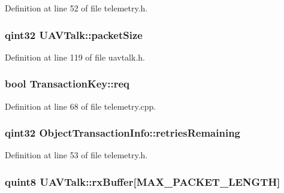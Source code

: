 Definition at line 52 of file telemetry.\-h.

\hypertarget{group___u_a_v_talk_plugin_gaa014be97504e5d24ac39f2808976685e}{
\subsubsection[{packet\-Size}]{\setlength{\rightskip}{0pt plus 5cm}qint32 U\-A\-V\-Talk\-::packet\-Size\hspace{0.3cm}{\ttfamily [protected]}}}\label{group___u_a_v_talk_plugin_gaa014be97504e5d24ac39f2808976685e}


Definition at line 119 of file uavtalk.\-h.

\hypertarget{group___u_a_v_talk_plugin_gafe5007a7f451f47110150ee417594a38}{
\subsubsection[{req}]{\setlength{\rightskip}{0pt plus 5cm}bool Transaction\-Key\-::req}}\label{group___u_a_v_talk_plugin_gafe5007a7f451f47110150ee417594a38}


Definition at line 68 of file telemetry.\-cpp.

\hypertarget{group___u_a_v_talk_plugin_gaf7cfad07635a777272c96c4b2fb2284b}{
\subsubsection[{retries\-Remaining}]{\setlength{\rightskip}{0pt plus 5cm}qint32 Object\-Transaction\-Info\-::retries\-Remaining}}\label{group___u_a_v_talk_plugin_gaf7cfad07635a777272c96c4b2fb2284b}


Definition at line 53 of file telemetry.\-h.

\hypertarget{group___u_a_v_talk_plugin_ga612e1b395a61ee81d90d8199ba789a86}{
\subsubsection[{rx\-Buffer}]{\setlength{\rightskip}{0pt plus 5cm}quint8 U\-A\-V\-Talk\-::rx\-Buffer\mbox{[}M\-A\-X\-\_\-\-P\-A\-C\-K\-E\-T\-\_\-\-L\-E\-N\-G\-T\-H\mbox{]}\hspace{0.3cm}{\ttfamily [protected]}}}\label{group___u_a_v_talk_plugin_ga612e1b395a61ee81d90d8199ba789a86}


